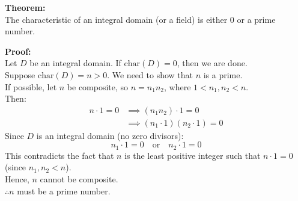 \documentclass[11pt]{article}
\begin{document}
\bigskip
\noindent \textbf{Theorem:} \\
The characteristic of an integral domain (or a field) is either $0$ or a prime number.

\medskip
\noindent \textbf{Proof:} \\
Let $D$ be an integral domain. If $\text{char}(D) = 0$, then we are done. \\
Suppose $\text{char}(D) = n > 0$. We need to show that $n$ is a prime. \\
If possible, let $n$ be composite, so $n = n_1 n_2$, where $1 < n_1, n_2 < n$. \\
Then:
\begin{align*}
n \cdot 1 = 0 &\implies (n_1 n_2) \cdot 1 = 0 \\
&\implies (n_1 \cdot 1)(n_2 \cdot 1) = 0
\end{align*}
Since $D$ is an integral domain (no zero divisors):
\[
n_1 \cdot 1 = 0 \quad \text{or} \quad n_2 \cdot 1 = 0
\]
This contradicts the fact that $n$ is the least positive integer such that $n \cdot 1 = 0$ (since $n_1, n_2 < n$). \\
Hence, $n$ cannot be composite. \\
$\therefore n$ must be a prime number.
\end{document}
